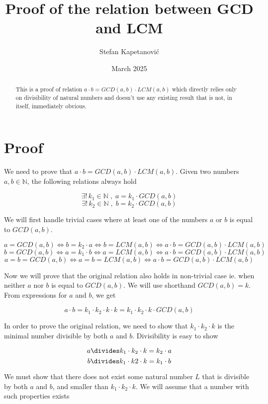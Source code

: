 \documentclass{article}
\title{Proof of the relation between GCD and LCM}
\author{ Stefan Kapetanović }
\date{March 2025}
\begin{document}
\maketitle

\begin{abstract}
This is a proof of relation $a \cdot b = GCD(a, b) \cdot LCM(a, b)$ which directly relies only on divisibility of natural numbers and doesn't use any existing result that is not, in itself, immediately obvious.
\end{abstract}

\section{Proof}

We need to prove that $a \cdot b = GCD(a, b) \cdot LCM(a, b)$.
Given two numbers $a, b \in \mathbb{N}$, the following relations always hold

\[ \exists! \, k_1 \in \mathbb{N} \; , \; a = k_1 \cdot GCD(a, b) \]
\[ \exists! \, k_2 \in \mathbb{N} \; , \; b = k_2 \cdot GCD(a, b) \]

We will first handle trivial cases where at least one of the numbers $a$ or $b$ is equal to $GCD(a, b)$.

\[ a = GCD(a, b) \iff b = k_2 \cdot a \iff b = LCM(a, b) \iff a \cdot b = GCD(a, b) \cdot LCM(a ,b) \]
\[ b = GCD(a, b) \iff a = k_1 \cdot b \iff a = LCM(a, b) \iff a \cdot b = GCD(a, b) \cdot LCM(a ,b) \]
\[ a = b = GCD(a, b) \iff a = b = LCM(a, b) \iff a \cdot b = GCD(a, b) \cdot LCM(a ,b) \]
\[\]

Now we will prove that the original relation also holds in non-trivial case ie. when neither $a$ nor $b$ is equal to $GCD(a, b)$. We will use shorthand $GCD(a, b) = k$. From expressions for $a$ and $b$, we get

\[ a \cdot b = k_1 \cdot k_2 \cdot k \cdot k = k_1 \cdot k_2 \cdot k \cdot GCD(a, b) \]
\[\]

In order to prove the original relation, we need to show that $k_1 \cdot k_2 \cdot k$ is the minimal number divisible by both $a$ and $b$. Divisibility is easy to show

\[ a \divides k_1 \cdot k_2 \cdot k = k_2 \cdot a \]
\[ b \divides k_1 \cdot k2 \cdot k = k_1 \cdot b \]

We must show that there does not exist some natural number $L$ that is divisible by both $a$ and $b$, and smaller than $k_1 \cdot k_2 \cdot k$. We will assume that a number with such properties exists
\end{document}
